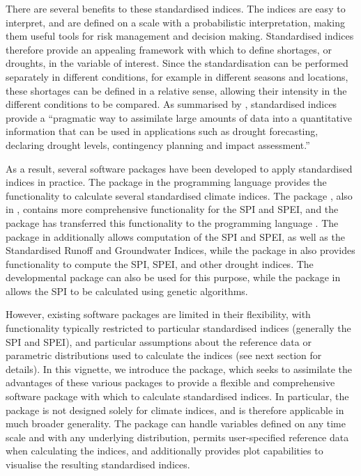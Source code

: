 \documentclass[article,shortnames,nojss]{jss}\usepackage[]{graphicx}\usepackage[]{xcolor}
\begin{document}
There are several benefits to these standardised indices. The indices are easy to interpret, and are defined on a scale with a probabilistic interpretation, making them useful tools for risk management and decision making. Standardised indices therefore provide an appealing framework with which to define shortages, or droughts, in the variable of interest. Since the standardisation can be performed separately in different conditions, for example in different seasons and locations, these shortages can be defined in a relative sense, allowing their intensity in the different conditions to be compared. As summarised by \cite{ZargarEtAl2011}, standardised indices provide a ``pragmatic way to assimilate large amounts of data into a quantitative information that can be used in applications such as drought forecasting, declaring drought levels, contingency planning and impact assessment.''

As a result, several software packages have been developed to apply standardised indices in practice. The  package \citep{SCI} in the programming language  \citep{R} provides the functionality to calculate several standardised climate indices. The  package \citep{SPEI-R}, also in , contains more comprehensive functionality for the SPI and SPEI, and the  package \citep{standard-precip} has transferred this functionality to the programming language  \citep{python}. The  package \citep{spei-python} in  additionally allows computation of the SPI and SPEI, as well as the Standardised Runoff and Groundwater Indices, while the  package in  also provides functionality to compute the SPI, SPEI, and other drought indices. The developmental package  \citep{standaRdized} can also be used for this purpose, while the  package \citep{SPIGA} in  allows the SPI to be calculated using genetic algorithms.

However, existing software packages are limited in their flexibility, with functionality typically restricted to particular standardised indices (generally the SPI and SPEI), and particular assumptions about the reference data or parametric distributions used to calculate the indices (see next section for details). In this vignette, we introduce the   package, which seeks to assimilate the advantages of these various packages to provide a flexible and comprehensive software package with which to calculate standardised indices. In particular, the package is not designed solely for climate indices, and is therefore applicable in much broader generality. The package can handle variables defined on any time scale and with any underlying distribution, permits user-specified reference data when calculating the indices, and additionally provides plot capabilities to visualise the resulting standardised indices.
\end{document}
